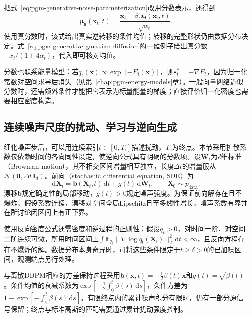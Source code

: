 把式~\eqref{eq:pgm-generative-noise-parameterization}改用分数表示，还得到
\[
  \bm{\mu}_{\bm{\theta}}(\bm{x}_t,t)
    =\frac{\bm{x}_t+\beta_t\bm{s}_{\bm{\theta}}(\bm{x}_t,t)}
            {\sqrt{\alpha_t}}.
\]
使用真分数时，该式给出真实逆转移的条件均值；转移的完整形状仍由数据分布决定。式~\eqref{eq:pgm-generative-gaussian-diffusion}的一维例子给出真分数$-x_t/(1+4\bar{\alpha}_t)$，代入即可核对均值。

分数也联系能量模型：若$q_t(\bm{x})\propto\exp[-E_t(\bm{x})]$，则$\bm{s}_t^*=-\nabla E_t$，因为归一化常数对空间求导后消失（见第~\ref{chap:pgm-energy-models}章）。一般向量网络近似分数时，还需额外条件才能把它表示为标量能量的梯度；直接评价归一化密度也需要相应密度构造。

\subsection{连续噪声尺度的扰动、学习与逆向生成}

\label{sec:pgm-generative-continuous-diffusion}

细化噪声步后，可以用连续索引$t\in[0,T_{\mathrm{c}}]$描述扰动，$T_{\mathrm{c}}$为终点。本节采用扩散系数仅依赖时间的各向同性设定，使逆向公式具有明确的分数项。设$\bm{W}_t$为$d$维标准（Brownian motion），其不相交区间增量相互独立，长度$\Delta t$的增量服从$\mathcal{N}(\bm{0},\Delta t\,\bm{I}_d)$。前向（stochastic differential equation, SDE）为
\begin{equation}
  \label{eq:pgm-generative-forward-sde}
  \mathrm{d}\bm{X}_t
  =\bm{b}(\bm{X}_t,t)\,\mathrm{d}t
    +g(t)\,\mathrm{d}\bm{W}_t,
  \qquad \bm{X}_0\sim p_{\mathrm{data}}.
\end{equation}
漂移$\bm{b}$规定确定性的局部移动，$g(t)>0$规定噪声强度。为保证前向解存在且不爆炸，假设系数连续，漂移对空间全局Lipschitz且至多线性增长，噪声系数有界并在所讨论闭区间上有正下界。

使用反向密度公式还需密度和逆过程的正则性：假设$q_t>0$，对时间一阶、对空间二阶连续可微，所用时间区间上$\int\mathbb{E}_{q_t}\lVert\nabla\log q_t(\bm{X}_t)\rVert_2^2\,\mathrm{d}t<\infty$，且反向方程存在不爆炸的解。数据分布本身奇异时，可将这些条件限定于$t\geq\delta>0$的已加噪区间，观测端点另行处理。

与离散DDPM相应的方差保持过程采用$\bm{b}(\bm{x},t)=-\tfrac12\beta(t)\bm{x}$和$g(t)=\sqrt{\beta(t)}$。条件均值的衰减系数为$\exp[-\tfrac12\int_0^t\beta(s)\,\mathrm{d}s]$，条件方差为$1-\exp[-\int_0^t\beta(s)\,\mathrm{d}s]$。有限终点内的累计噪声积分有限时，仍有一部分原信号保留；终点与标准高斯的匹配需要通过累计扰动强度控制。


